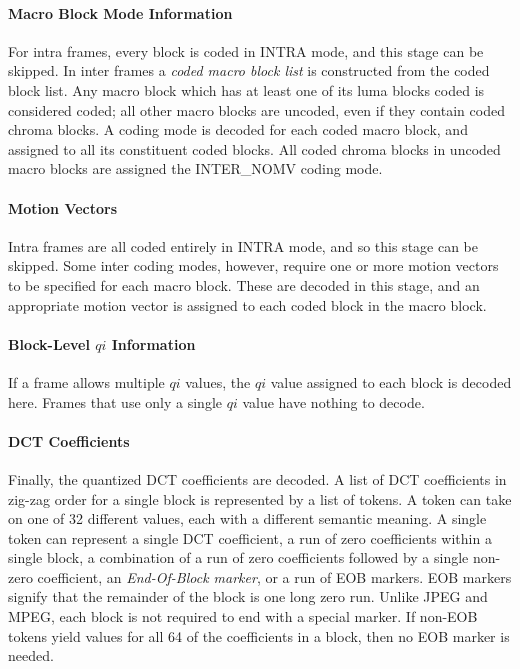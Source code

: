 \documentclass[11pt,letterpaper]{article}
\newcommand{\qi}{\ensuremath{\mathit{qi}} }
\newcommand{\term}[1]{{\em #1}}
\begin{document}
\paragraph{Macro Block Mode Information}

For intra frames, every block is coded in INTRA mode, and this stage can be
 skipped.
In inter frames a \term{coded macro block list} is constructed from the coded
 block list.
Any macro block which has at least one of its luma blocks coded is considered
 coded; all other macro blocks are uncoded, even if they contain coded chroma
 blocks.
A coding mode is decoded for each coded macro block, and assigned to all its
 constituent coded blocks.
All coded chroma blocks in uncoded macro blocks are assigned the INTER\_NOMV
 coding mode.

\paragraph{Motion Vectors}

Intra frames are all coded entirely in INTRA mode, and so this stage can be
 skipped.
Some inter coding modes, however, require one or more motion vectors to be
 specified for each macro block.
These are decoded in this stage, and an appropriate motion vector is assigned
 to each coded block in the macro block.

\paragraph{Block-Level \qi Information}

If a frame allows multiple \qi values, the \qi value assigned to each block is
 decoded here.
Frames that use only a single \qi value have nothing to decode.

\paragraph{DCT Coefficients}

Finally, the quantized DCT coefficients are decoded.
A list of DCT coefficients in zig-zag order for a single block is represented
 by a list of tokens.
A token can take on one of 32 different values, each with a different semantic
 meaning.
A single token can represent a single DCT coefficient, a run of zero
 coefficients within a single block, a combination of a run of zero
 coefficients followed by a single non-zero coefficient, an
 \term{End-Of-Block marker}, or a run of EOB markers.
EOB markers signify that the remainder of the block is one long zero run.
Unlike JPEG and MPEG, each block is not required to end with a special marker.
If non-EOB tokens yield values for all 64 of the coefficients in a block, then
 no EOB marker is needed.
\end{document}
